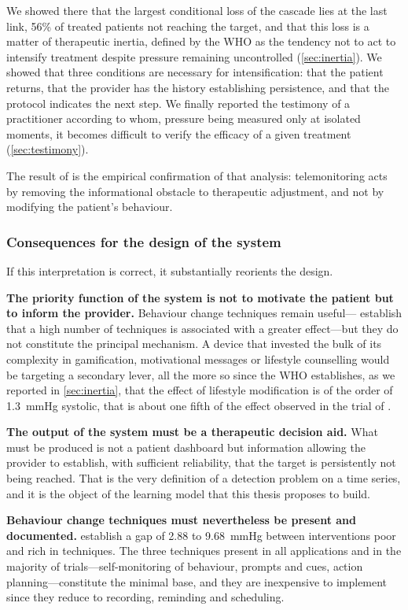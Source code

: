 \documentclass[12pt,a4paper,oneside]{report}
\begin{document}
We showed there that the largest conditional loss of the cascade lies at the last link, 56\% of treated patients not reaching the target, and that this loss is a matter of therapeutic inertia, defined by the WHO as the tendency not to act to intensify treatment despite pressure remaining uncontrolled (\cref{sec:inertia}). We showed that three conditions are necessary for intensification: that the patient returns, that the provider has the history establishing persistence, and that the protocol indicates the next step. We finally reported the testimony of a practitioner according to whom, pressure being measured only at isolated moments, it becomes difficult to verify the efficacy of a given treatment (\cref{sec:testimony}).

The result of \textcite{mihevc2025} is the empirical confirmation of that analysis: telemonitoring acts by removing the informational obstacle to therapeutic adjustment, and not by modifying the patient's behaviour.

\subsubsection{Consequences for the design of the system}

If this interpretation is correct, it substantially reorients the design.

\textbf{The priority function of the system is not to motivate the patient but to inform the provider.} Behaviour change techniques remain useful---\textcite{zhou2024} establish that a high number of techniques is associated with a greater effect---but they do not constitute the principal mechanism. A device that invested the bulk of its complexity in gamification, motivational messages or lifestyle counselling would be targeting a secondary lever, all the more so since the WHO establishes, as we reported in \cref{sec:inertia}, that the effect of lifestyle modification is of the order of 1.3~mmHg systolic, that is about one fifth of the effect observed in the trial of \textcite{mihevc2025}.

\textbf{The output of the system must be a therapeutic decision aid.} What must be produced is not a patient dashboard but information allowing the provider to establish, with sufficient reliability, that the target is persistently not being reached. That is the very definition of a detection problem on a time series, and it is the object of the learning model that this thesis proposes to build.

\textbf{Behaviour change techniques must nevertheless be present and documented.} \Textcite{zhou2024} establish a gap of 2.88 to 9.68~mmHg between interventions poor and rich in techniques. The three techniques present in all applications and in the majority of trials---self-monitoring of behaviour, prompts and cues, action planning---constitute the minimal base, and they are inexpensive to implement since they reduce to recording, reminding and scheduling.
\end{document}
